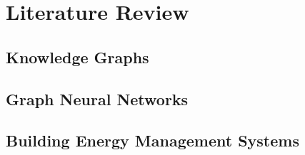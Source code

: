 \chapter{Literature Review}\label{chap:literature-review}

\section{Knowledge Graphs}\label{sec:knowledge-graphs}


\section{Graph Neural Networks}\label{sec:graph-neural-networks}

\section{Building Energy Management Systems}\label{sec:building-energy-management-systems}

